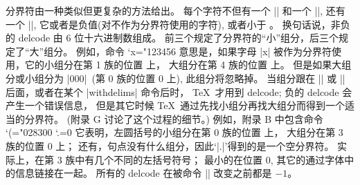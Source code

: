 \ddanger 分界符由一种类似但更复杂的方法给出。%
每个字符不但有一个 |\catcode| 和一个 |\mathcode|,
还有一个 |\delcode|, 它或者是负值(对不作为分界符使用的字符),
或者小于 。%
换句话说，非负的 delcode 由 6 位十六进制数组成。%
前三个规定了分界符的``小''组分，后三个规定了``大''组分。%
例如，命令
\begintt
\delcode`x="123456
\endtt
意思是，如果字母 |x| 被作为分界符使用，它的小组分在第 1 族的位置  上，
大组分在第 4 族的位置  上。%
但是如果大组分或小组分为 |000|~(第 0 族的位置 0 上),
此组分将忽略掉。%
当组分跟在 |\left| 或 |\right| 后面，或者在某个 |withdelims| 命令后时，
 \TeX\ 才用到 delcode;
负的 delcode 会产生一个错误信息，
但是其它时候 \TeX\ 通过先找小组分再找大组分而得到一个适当的分界符。%
(附录 G 讨论了这个过程的细节。)
例如，附录 B 中包含命令
\begintt
\delcode`(="028300  \delcode`.=0
\endtt
它表明，左圆括号的小组分在第 0 族的位置  上，
大组分在第 3 族的位置 0 上；
还有，句点没有什么组分，因此`|\left.|'得到的是一个空分界符。%
实际上，在第 3 族中有几个不同的左括号符号；
最小的在位置 0,
其它的通过字体中的信息链接在一起。%
所有的 delcode 在被命令 |\delcode| 改变之前都是 $-1$。

